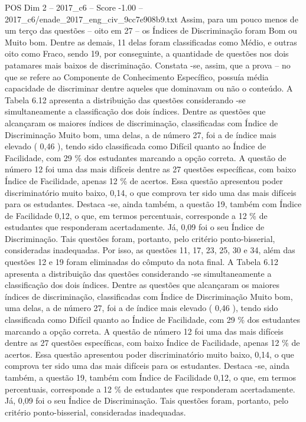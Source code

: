 \begin{textsample}{POS Dim 2 – 2017\_c6 – Score -1.00 – 2017\_c6/enade\_2017\_eng\_civ\_9cc7e908b9.txt}
Assim, para um pouco menos de um terço das questões – oito em 27 – os Índices de Discriminação foram Bom ou Muito bom.
Dentre as demais, 11 delas foram classificadas como Médio, e outras oito como Fraco, sendo 19, por conseguinte, a quantidade de questões nos dois patamares mais baixos de discriminação.
Constata -se, assim, que a prova – no que se refere ao Componente de Conhecimento Específico, possuía média capacidade de discriminar dentre aqueles que dominavam ou não o conteúdo.
A Tabela 6.12 apresenta a distribuição das questões considerando -se simultaneamente a classificação dos dois índices.
Dentre as questões que alcançaram os maiores índices de discriminação, classificadas com Índice de Discriminação Muito bom, uma delas, a de número 27, foi a de índice mais elevado ( 0,46 ), tendo sido classificada como Difícil quanto ao Índice de Facilidade, com 29 \% dos estudantes marcando a opção correta.
A questão de número 12 foi uma das mais difíceis dentre as 27 questões específicas, com baixo Índice de Facilidade, apenas 12 \% de acertos.
Essa questão apresentou poder discriminatório muito baixo, 0,14, o que comprova ter sido uma das mais difíceis para os estudantes.
Destaca -se, ainda também, a questão 19, também com Índice de Facilidade 0,12, o que, em termos percentuais, corresponde a 12 \% de estudantes que responderam acertadamente.
Já, 0,09 foi o seu Índice de Discriminação.
Tais questões foram, portanto, pelo critério ponto-bisserial, consideradas inadequadas.
Por isso, as questões 11, 17, 23, 25, 30 e 34, além das questões 12 e 19 foram eliminadas do cômputo da nota final.
A Tabela 6.12 apresenta a distribuição das questões considerando -se simultaneamente a classificação dos dois índices.
Dentre as questões que alcançaram os maiores índices de discriminação, classificadas com Índice de Discriminação Muito bom, uma delas, a de número 27, foi a de índice mais elevado ( 0,46 ), tendo sido classificada como Difícil quanto ao Índice de Facilidade, com 29 \% dos estudantes marcando a opção correta.
A questão de número 12 foi uma das mais difíceis dentre as 27 questões específicas, com baixo Índice de Facilidade, apenas 12 \% de acertos.
Essa questão apresentou poder discriminatório muito baixo, 0,14, o que comprova ter sido uma das mais difíceis para os estudantes.
Destaca -se, ainda também, a questão 19, também com Índice de Facilidade 0,12, o que, em termos percentuais, corresponde a 12 \% de estudantes que responderam acertadamente.
Já, 0,09 foi o seu Índice de Discriminação.
Tais questões foram, portanto, pelo critério ponto-bisserial, consideradas inadequadas.

\end{textsample}
